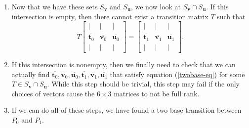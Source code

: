 \documentclass[a4paper,10pt]{article}
\theoremstyle{plain}
\theoremstyle{definition}
\theoremstyle{remark}
\renewcommand{\vec}[1]{\textbf{#1}}
\begin{document}
\begin{enumerate}
    \item Now that we have these sets \(S_\vec{v}\) and \(S_\vec{u}\), we now look at \(S_\vec{v} \cap S_\vec{u}\).
    If this intersection is empty, then there cannot exist a transition matrix \(T\) such that \[T\begin{bmatrix}
    | & | & | \\
    \overline{\vec{t}_0} & \overline{\vec{v}_0} & \overline{\vec{u}_0} \\
    | & | & |
    \end{bmatrix} = \begin{bmatrix}
    | & | & | \\
    \overline{\vec{t}_1} & \overline{\vec{v}_1} & \overline{\vec{u}_1} \\
    | & | & |
    \end{bmatrix}.\]
    \item If this intersection is nonempty, then we finally need to check that we can actually find \(\overline{\vec{t}_0}, \overline{\vec{v}_0}, \overline{\vec{u}_0}, \overline{\vec{t}_1}, \overline{\vec{v}_1}, \overline{\vec{u}_1}\) that satisfy equation (\ref{twobase-eq}) for some \(T \in S_\vec{v} \cap S_\vec{u}\).
        While this step should be trivial, this step may fail if the only choices of vectors cause the \(6 \times 3\) matrices to not be full rank.
    \item If we can do all of these steps, we have found a two base transition between \(P_0\) and \(P_1\).
\end{enumerate}
\end{document}
